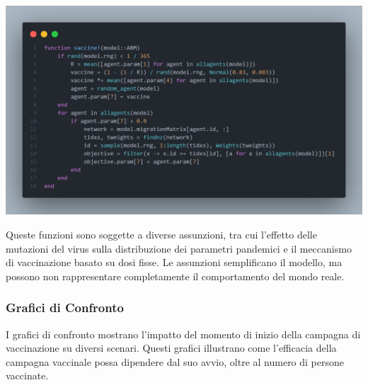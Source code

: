 \begin{minipage}{\linewidth}
	\centering
	\includegraphics[width=\textwidth]{img/vaccine.png}
	\label{fig:vaccine}
\end{minipage}

Queste funzioni sono soggette a diverse assunzioni, tra cui l'effetto 
delle mutazioni del virus sulla distribuzione dei parametri pandemici e 
il meccanismo di vaccinazione basato su dosi fisse. Le assunzioni 
semplificano il modello, ma possono non rappresentare completamente 
il comportamento del mondo reale.

\subsubsection*{Grafici di Confronto}

I grafici di confronto mostrano l'impatto del momento di inizio della 
campagna di vaccinazione su diversi scenari. Questi grafici illustrano 
come l'efficacia della campagna vaccinale possa dipendere dal suo avvio, 
oltre al numero di persone vaccinate.

